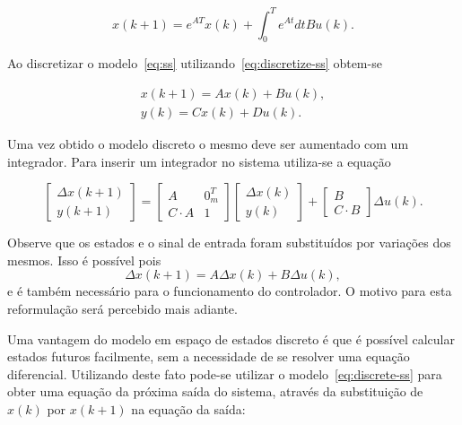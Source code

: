 \begin{equation}
	\label{eq:discretize-ss}
	x(k+1) = e^{AT} x(k) + \int^T_0{e^{At}dt}B u(k).
\end{equation}

Ao discretizar o modelo~\eqref{eq:ss} utilizando~\eqref{eq:discretize-ss}
obtem-se

\begin{equation}
	\label{eq:discrete-ss}
	\begin{split}
		x(k+1) = A x(k) + B u(k), \\
		y(k) = C x(k) + Du(k).
	\end{split}
\end{equation}

Uma vez obtido o modelo discreto o mesmo deve ser aumentado com um integrador.
Para inserir um integrador no sistema utiliza-se a
equação

\begin{equation}
	\label{eq:augment-matrix}
	\begin{bmatrix}
		\Delta x(k+1) \\
		y(k+1)
	\end{bmatrix} =
	\begin{bmatrix}
		A         & 0_m^T \\
		C\cdot{}A & 1
	\end{bmatrix}
	\begin{bmatrix}
		\Delta x(k) \\
		y(k)
	\end{bmatrix} +
	\begin{bmatrix}
		B \\
		C\cdot{}B
	\end{bmatrix}
	\Delta u(k).
\end{equation}

Observe que os estados e o sinal de entrada foram substituídos por variações dos
mesmos. Isso é possível pois
%
\begin{equation}
	\Delta x(k+1) = A \Delta x(k) + B \Delta u(k),
\end{equation}
%
e é também necessário para o funcionamento do controlador. O motivo para esta
reformulação será percebido mais adiante.

Uma vantagem do modelo em espaço de estados discreto é que é possível calcular
estados futuros facilmente, sem a necessidade de se resolver uma equação
diferencial. Utilizando deste fato pode-se utilizar o
modelo~\eqref{eq:discrete-ss} para obter uma equação da próxima saída do
sistema, através da substituição de \( x(k) \) por \( x(k+1) \) na equação da
saída:

